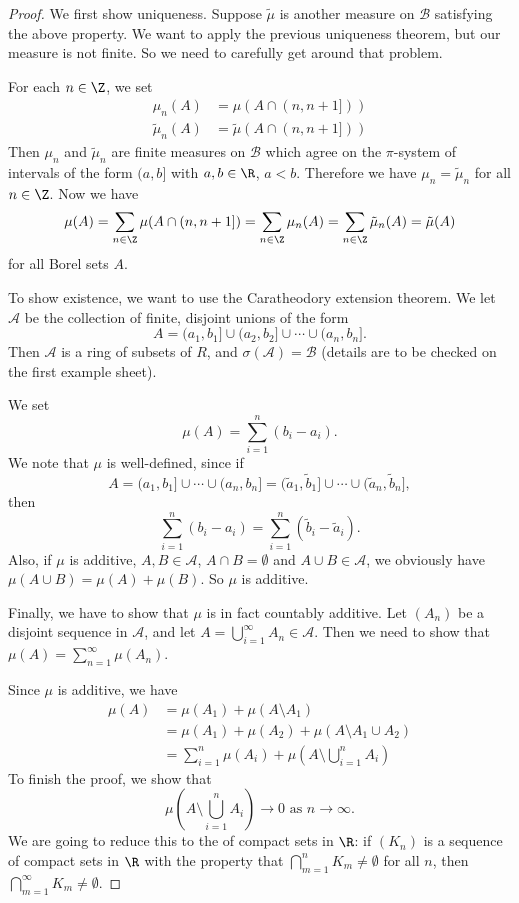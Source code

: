 \documentclass[a4paper]{article}
\begin{document}
\begin{proof}
  We first show uniqueness. Suppose $\tilde{\mu}$ is another measure on $\mathcal{B}$ satisfying the above property. We want to apply the previous uniqueness theorem, but our measure is not finite. So we need to carefully get around that problem.

  For each $n \in \Z$, we set
  \begin{align*}
    \mu_n(A) &= \mu(A \cap (n, n + 1]))\\
    \tilde{\mu}_n(A) &= \tilde{\mu}(A \cap (n, n + 1]))
  \end{align*}
  Then $\mu_n$ and $\tilde{\mu}_n$ are finite measures on $\mathcal{B}$ which agree on the $\pi$-system of intervals of the form $(a, b]$ with $a, b \in \R$, $a < b$. Therefore we have $\mu_n = \tilde{\mu}_n$ for all $n \in \Z$. Now we have
  \[
    \mu(A) = \sum_{n \in \Z} \mu(A \cap (n, n + 1]) = \sum_{n\in \Z}\mu_n(A) = \sum_{n \in \Z}\tilde{\mu}_n(A) = \tilde{\mu}(A)
  \]
  for all Borel sets $A$.

  To show existence, we want to use the Caratheodory extension theorem. We let $\mathcal{A}$ be the collection of finite, disjoint unions of the form
  \[
    A = (a_1, b_1] \cup (a_2, b_2] \cup \cdots \cup (a_n, b_n].
  \]
  Then $\mathcal{A}$ is a ring of subsets of $R$, and $\sigma(\mathcal{A}) = \mathcal{B}$ (details are to be checked on the first example sheet).

  We set
  \[
    \mu(A) = \sum_{i = 1}^n (b_i - a_i).
  \]
  We note that $\mu$ is well-defined, since if
  \[
    A = (a_1, b_1] \cup \cdots \cup (a_n, b_n] = (\tilde{a}_1, \tilde{b}_1] \cup \cdots \cup (\tilde{a}_n, \tilde{b}_n],
  \]
  then
  \[
    \sum_{i = 1}^n (b_i - a_i) = \sum_{i = 1}^n (\tilde{b}_i - \tilde{a}_i).
  \]
  Also, if $\mu$ is additive, $A, B \in \mathcal{A}$, $A \cap B = \emptyset$ and $A \cup B \in \mathcal{A}$, we obviously have $\mu(A \cup B) = \mu(A) + \mu(B)$. So $\mu$ is additive.

  Finally, we have to show that $\mu$ is in fact countably additive. Let $(A_n)$ be a disjoint sequence in $\mathcal{A}$, and let $A = \bigcup_{i = 1}^\infty A_n \in \mathcal{A}$. Then we need to show that $\mu(A) = \sum_{n = 1}^\infty \mu(A_n)$.

  Since $\mu$ is additive, we have
  \begin{align*}
    \mu(A) &= \mu(A_1) + \mu(A \setminus A_1) \\
    &= \mu(A_1) + \mu(A_2) + \mu(A \setminus A_1 \cup A_2)\\
    &= \sum_{i = 1}^n \mu(A_i) + \mu\left(A \setminus \bigcup_{i = 1}^n A_i\right)
  \end{align*}
  To finish the proof, we show that
  \[
    \mu\left(A \setminus \bigcup_{i = 1}^n A_i\right) \to 0\text{ as }n \to \infty.
  \]
  We are going to reduce this to the  of compact sets in $\R$: if $(K_n)$ is a sequence of compact sets in $\R$ with the property that $\bigcap_{m = 1}^n K_m \not= \emptyset$ for all $n$, then $\bigcap_{m = 1}^\infty K_m \not= \emptyset$.


\end{proof}
\end{document}
